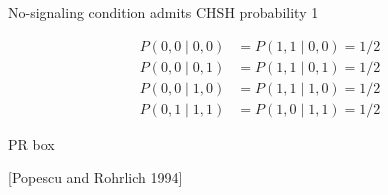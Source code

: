 \documentclass{beamer}
\begin{document}
\begin{frame}{No-signaling condition admits CHSH probability 1}

\begin{align*}
P(0, 0\mid 0, 0) &=
P(1, 1\mid 0, 0) = 1/2\\
P(0, 0\mid 0, 1) &=
P(1, 1\mid 0, 1) = 1/2\\
P(0, 0\mid 1, 0) &=
P(1, 1\mid 1, 0) = 1/2\\
P(0, 1\mid 1, 1) &=
P(1, 0\mid 1, 1) = 1/2
\end{align*}

\vspace{1em}
\begin{center}
PR box

[Popescu and  Rohrlich 1994]
\end{center}
\end{frame}
\end{document}
